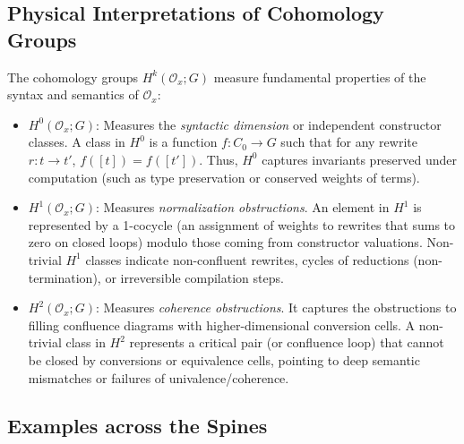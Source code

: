 \documentclass{article}
\theoremstyle{definition}
\theoremstyle{plain}
\begin{document}
\subsection{Physical Interpretations of Cohomology Groups}
The cohomology groups $H^k(\mathcal{O}_x; G)$ measure fundamental properties of the syntax and semantics of $\mathcal{O}_x$:
\begin{itemize}
    \item $H^0(\mathcal{O}_x; G)$: Measures the \emph{syntactic dimension} or independent constructor classes. A class in $H^0$ is a function $f : C_0 \to G$ such that for any rewrite $r : t \to t'$, $f([t]) = f([t'])$. Thus, $H^0$ captures invariants preserved under computation (such as type preservation or conserved weights of terms).
    \item $H^1(\mathcal{O}_x; G)$: Measures \emph{normalization obstructions}. An element in $H^1$ is represented by a 1-cocycle (an assignment of weights to rewrites that sums to zero on closed loops) modulo those coming from constructor valuations. Non-trivial $H^1$ classes indicate non-confluent rewrites, cycles of reductions (non-termination), or irreversible compilation steps.
    \item $H^2(\mathcal{O}_x; G)$: Measures \emph{coherence obstructions}. It captures the obstructions to filling confluence diagrams with higher-dimensional conversion cells. A non-trivial class in $H^2$ represents a critical pair (or confluence loop) that cannot be closed by conversions or equivalence cells, pointing to deep semantic mismatches or failures of univalence/coherence.
\end{itemize}

\newpage
\subsection{Examples across the Spines}
\end{document}
